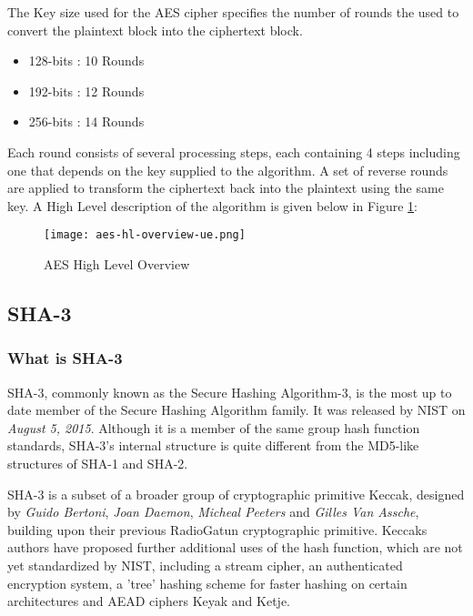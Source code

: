The Key size used for the AES cipher specifies the number of rounds the used to convert the plaintext block into the ciphertext block.

\begin{itemize}
\item{128-bits : 10 Rounds}
\item{192-bits : 12 Rounds}
\item{256-bits : 14 Rounds}
\end{itemize}

Each round consists of several processing steps, each containing 4 steps including one that depends on the key supplied to the algorithm. A set of reverse rounds are applied to transform the ciphertext back into the plaintext using the same key. A High Level description of the algorithm is given below in Figure \ref{AES-HL-Overview}:

\vspace{0.3cm}

\begin{figure}[h!]
\begin{center}
\texttt{[image: aes-hl-overview-ue.png]}
\end{center}
\caption{AES High Level Overview}
\label{AES-HL-Overview}
\end{figure}

    

\subsection{SHA-3}
\subsubsection{What is SHA-3}

SHA-3, commonly known as the Secure Hashing Algorithm-3, is the most up to date member of the Secure Hashing Algorithm family. It was released by NIST on \textit{August 5, 2015}. Although it is a member of the same group hash function standards, SHA-3's internal structure is quite different from the MD5-like structures of SHA-1 and SHA-2.

SHA-3 is a subset of a broader group of cryptographic primitive Keccak, designed by \textit{Guido Bertoni}, \textit{Joan Daemon}, \textit{Micheal Peeters} and \textit{Gilles Van Assche}, building upon their previous RadioGatun cryptographic primitive. Keccaks authors have proposed further additional uses of the hash function, which are not yet standardized by NIST, including a stream cipher, an authenticated encryption system, a 'tree' hashing scheme for faster hashing on certain architectures and AEAD ciphers Keyak and Ketje. 

